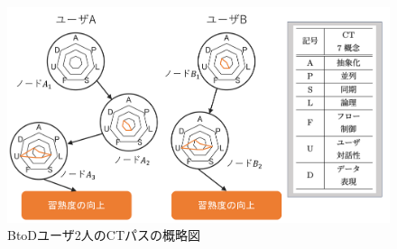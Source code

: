 \documentclass[submit,ses,noauthor]{ipsj}
\begin{document}
\begin{figure}[t]
    \centering
    \includegraphics[width=1.0\linewidth]{Okamoto_fig/graph.pdf}
    \caption{BtoDユーザ2人のCTパスの概略図}
    \label{fig:digraph}
    \vspace{-4mm}
\end{figure}
\end{document}
